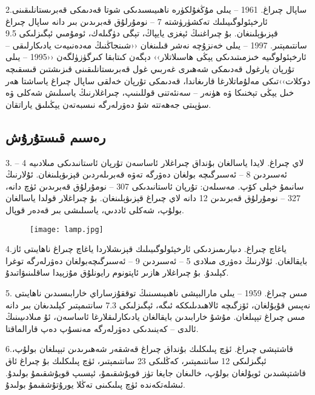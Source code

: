 \documentclass[24]{article}
\begin{document}
\begin{titlepage}
\begin{Arabic}
\begin{multicols}{3}
2.ساپال {\huge{چىراغ}}. 1961 – يىلى مۇڭغۇلكۈرە ناھىيىسىدىكى شوتا قەدىمكى قەبرىستانلىقىنى ئارخېئولوگىيىلىك تەكشۈرۈشتە 7 – نومۇرلۇق قەبرىدىن بىر دانە ساپال چىراغ قېزىۋېلىنغان. بۇ چىراغنىڭ ئېغزى يايپاڭ، تېگى دۈگىلەك، ئومۇمىي ئېگىزلىكى 9.5 سانتىمېتىر. 1997 – يىلى خەنزۇچە نەشر قىلىنغان ‹‹شىنجاڭنىڭ مەدەنىيەت يادىكارلىقى – ئارخېئولوگىيە خىزمىتىدىكى يېڭى ھاسىلاتلار›› دېگەن كىتابقا كىرگۈزۈلگەن ‹‹1995 – يىلى تۇرپان يارغول قەدىمكى شەھىرى غەربىي غول قەبرىستانلىقىنى قىزىشتىن قىسقىچە دوكلات››تىكى مەلۇماتلارغا قارىغاندا، قەدىمكى تۇرپان خەلقى ساپال چىراغ ياساشتا ھەر خىل يېڭى تېخنىكا ۋە ھۈنەر – سەنئەتنى قوللىنىپ، چىراغلارنىڭ ياسىلىش شەكلى ۋە سۈپىتى جەھەتتە شۇ دەۋرلەرگە نىسبەتەن يېڭىلىق ياراتقان.
\end{multicols}
\end{Arabic}

\begin{Arabic}

\renewfontfamily{}
\section{\textarabic{رەسىم قىستۇرۇش}}

3. لاي چىراغ. لايدا ياسالغان بۇنداق چىراغلار ئاساسەن تۇرپان ئاستانىدىكى مىلادىيە 4 – ئەسىردىن 8 – ئەسىرگىچە بولغان دەۋرگە تەۋە قەبرىلەردىن قېزىۋېلىنغان. ئۇلارنىڭ سانىمۇ خېلى كۆپ. مەسىلەن: تۇرپان ئاستانىدىكى 307 – نومۇرلۇق قەبرىدىن ئۈچ دانە، 327 – نومۇرلۇق قەبرىدىن 12 دانە لاي چىراغ قېزىۋېلىنغان. بۇ چىراغلار قولدا ياسالغان بولۇپ، شەكلى ئاددىي، ياسىلىشى بىر قەدەر قوپال.

\begin{wrapfigure}{r}{0.6\textwidth}
  \begin{center}
    \texttt{[image: lamp.jpg]}
  \end{center}
\end{wrapfigure}
4.ياغاچ چىراغ. دىيارىمىزدىكى ئارخېئولوگىيىلىك قېزىشلاردا ياغاچ چىراغ ناھايىتى ئاز بايقالغان. ئۇلارنىڭ دەۋرى مىلادى 5 – ئەسىردىن 9 – ئەسىرگىچەبولغان دەۋرلەرگە توغرا كېلىدۇ. بۇ چىراغلار ھازىر ئاپتونوم رايونلۇق مۇزېيدا ساقلىنىۋاتىدۇ.

5. مىس چىراغ. 1959 – يىلى مارالبېشى ناھىيىسىنىڭ توققۇزساراي خارابىسىدىن ناھايىتى نەپىس قۇيۇلغان، ئۆزگىچە ئالاھىدىلىككە ئىگە، ئېگىزلىكى 7.3 سانتىمېتىر كېلىدىغان بىر دانە مىس چىراغ تېپىلغان. مۇشۇ خارابىدىن بايقالغان يادىكارلىقلارغا ئاساسەن، ئۇ مىلادىيىنىڭ ئالدى – كەينىدىكى دەۋرلەرگە مەنسۇپ دەپ قارالماقتا.

6.قاشتېشى چىراغ. ئۈچ پىلىكلىك بۇنداق چىراغ قەشقەر شەھىرىدىن تېپىلغان بولۇپ، ئېگىزلىكى 12 سانتىمېتىر، كەڭلىكى 23 سانتىمېتىر، ئۈچ پىلىكلىك بۇ چىراغ ئاق قاشتېشىدىن ئويۇلغان بولۇپ، خالىغان جايغا تۈز قويۇشقىمۇ، ئېسىپ قويۇشقىمۇ بولىدۇ. ئىشلەتكەندە ئۈچ پىلىكىنى تەڭلا يورۇتۇشقىمۇ بولىدۇ.


\end{Arabic}
\end{titlepage}
\end{document}
